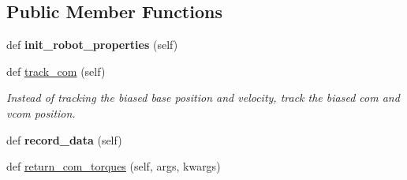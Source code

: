 \subsection*{Public Member Functions}
\begin{DoxyCompactItemize}
\item 
def {\bfseries init\+\_\+robot\+\_\+properties} (self)\hypertarget{classpython_1_1dg__tools_1_1leg__impedance__control_1_1solo12__impedance__controller_1_1Solo12ComController_aa7773494f8f24198a332ad0552332ca8}{}\label{classpython_1_1dg__tools_1_1leg__impedance__control_1_1solo12__impedance__controller_1_1Solo12ComController_aa7773494f8f24198a332ad0552332ca8}

\item 
def \hyperlink{classpython_1_1dg__tools_1_1leg__impedance__control_1_1solo12__impedance__controller_1_1Solo12ComController_a386f7ccf7b6fc883ca4f9ca361283ff1}{track\+\_\+com} (self)\hypertarget{classpython_1_1dg__tools_1_1leg__impedance__control_1_1solo12__impedance__controller_1_1Solo12ComController_a386f7ccf7b6fc883ca4f9ca361283ff1}{}\label{classpython_1_1dg__tools_1_1leg__impedance__control_1_1solo12__impedance__controller_1_1Solo12ComController_a386f7ccf7b6fc883ca4f9ca361283ff1}

\begin{DoxyCompactList}\small\item\em Instead of tracking the biased base position and velocity, track the biased com and vcom position. \end{DoxyCompactList}\item 
def {\bfseries record\+\_\+data} (self)\hypertarget{classpython_1_1dg__tools_1_1leg__impedance__control_1_1solo12__impedance__controller_1_1Solo12ComController_a4d8870b7a2d8e41ad92b2147c456656f}{}\label{classpython_1_1dg__tools_1_1leg__impedance__control_1_1solo12__impedance__controller_1_1Solo12ComController_a4d8870b7a2d8e41ad92b2147c456656f}

\item 
def \hyperlink{classpython_1_1dg__tools_1_1leg__impedance__control_1_1solo12__impedance__controller_1_1Solo12ComController_a6791d1b7bbdcca3859cb85358822bb07}{return\+\_\+com\+\_\+torques} (self, args, kwargs)
\end{DoxyCompactItemize}
